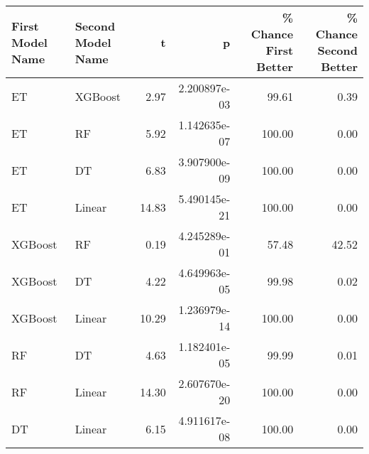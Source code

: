 \begin{tabular}{llrrrr}
\toprule
First Model Name & Second Model Name &     t &            p &  \% Chance First Better &  \% Chance Second Better \\
\midrule
              ET &           XGBoost &  2.97 & 2.200897e-03 &                  99.61 &                    0.39 \\
              ET &                RF &  5.92 & 1.142635e-07 &                 100.00 &                    0.00 \\
              ET &                DT &  6.83 & 3.907900e-09 &                 100.00 &                    0.00 \\
              ET &            Linear & 14.83 & 5.490145e-21 &                 100.00 &                    0.00 \\
         XGBoost &                RF &  0.19 & 4.245289e-01 &                  57.48 &                   42.52 \\
         XGBoost &                DT &  4.22 & 4.649963e-05 &                  99.98 &                    0.02 \\
         XGBoost &            Linear & 10.29 & 1.236979e-14 &                 100.00 &                    0.00 \\
              RF &                DT &  4.63 & 1.182401e-05 &                  99.99 &                    0.01 \\
              RF &            Linear & 14.30 & 2.607670e-20 &                 100.00 &                    0.00 \\
              DT &            Linear &  6.15 & 4.911617e-08 &                 100.00 &                    0.00 \\
\bottomrule
\end{tabular}
